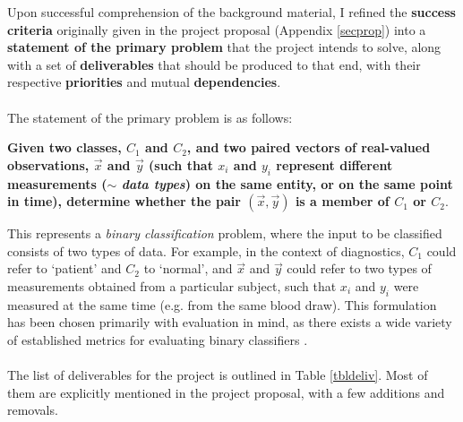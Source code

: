 \documentclass[12pt,a4paper,twoside,openright]{report}
\begin{document}
Upon successful comprehension of the background material, I refined the {\bf success criteria} originally given in the project proposal (Appendix \ref{secprop}) into a {\bf statement of the primary problem} that the project intends to solve, along with a set of {\bf deliverables} that should be produced to that end, with their respective {\bf priorities} and mutual {\bf dependencies}.\\ \\
The statement of the primary problem is as follows:
\begin{framed}
	\noindent \textbf{Given two classes, $C_1$ and $C_2$, and two paired vectors of real-valued observations, $\vec{x}$ and $\vec{y}$ (such that $x_i$ and $y_i$ represent different measurements ($\sim$ \emph{data types}) on the same entity, or on the same point in time), determine whether the pair $(\vec{x}, \vec{y})$ is a member of $C_1$ or $C_2$}.
\end{framed}
\noindent This represents a \emph{binary classification} problem, where the input to be classified consists of two types of data. For example, in the context of diagnostics, $C_1$ could refer to `patient' and $C_2$ to `normal', and $\vec{x}$ and $\vec{y}$ could refer to two types of measurements obtained from a particular subject, such that $x_i$ and $y_i$ were measured at the same time (e.g. from the same blood draw). This formulation has been chosen primarily with evaluation in mind, as there exists a wide variety of established metrics for evaluating binary classifiers \cite{powers2011evaluation}.\\ \\
The list of deliverables for the project is outlined in Table \ref{tbldeliv}. Most of them are explicitly mentioned in the project proposal, with a few additions and removals.
\end{document}
